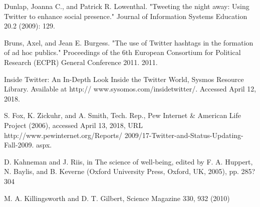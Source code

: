 \documentclass[journal, a4paper]{IEEEtran}
\begin{document}
\begin{thebibliography}{5}
   Dunlap, Joanna C., and Patrick R. Lowenthal. "Tweeting the night away: Using Twitter to enhance social presence." Journal of Information Systems Education 20.2 (2009): 129.
   
   Bruns, Axel, and Jean E. Burgess. "The use of Twitter hashtags in the formation of ad hoc publics." Proceedings of the 6th European Consortium for Political Research (ECPR) General Conference 2011. 2011.
   
   Inside Twitter: An In-Depth Look Inside the Twitter World, Sysmos Resource Library. Available at http:// www.sysomos.com/insidetwitter/. Accessed April 12, 2018.
   
   S. Fox, K. Zickuhr, and A. Smith, Tech. Rep., Pew Internet \& American Life Project (2006), accessed April 13, 2018, URL http://www.pewinternet.org/Reports/
2009/17-Twitter-and-Status-Updating-Fall-2009.
aspx.
   
   D. Kahneman and J. Riis, in The science of well-being,
edited by F. A. Huppert, N. Baylis, and B. Keverne
(Oxford University Press, Oxford, UK, 2005), pp. 285?
304
   
   M. A. Killingsworth and D. T. Gilbert, Science Magazine
330, 932 (2010)

\end{thebibliography}

\end{document}
